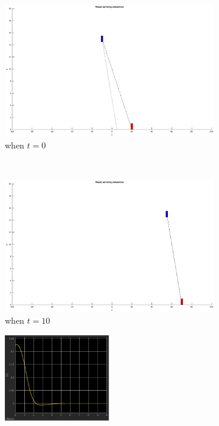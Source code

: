 \begin{figure}
	\centering
	\begin{subfigure}[b]{0.45\linewidth}
		\includegraphics[width=\textwidth]{images/chapter4/simple_zero}
		\caption{when $t=0$}
	\end{subfigure}
	~ %
	\begin{subfigure}[b]{0.45\linewidth}
		\includegraphics[width=\textwidth]{images/chapter4/simple_ten}
		\caption{when $t=10$}
	\end{subfigure}
	\begin{subfigure}[b]{0.8\linewidth}
		\centering
		\includegraphics[width=0.5\textwidth]{images/chapter4/simple_ex}

\end{subfigure}
\end{figure}
